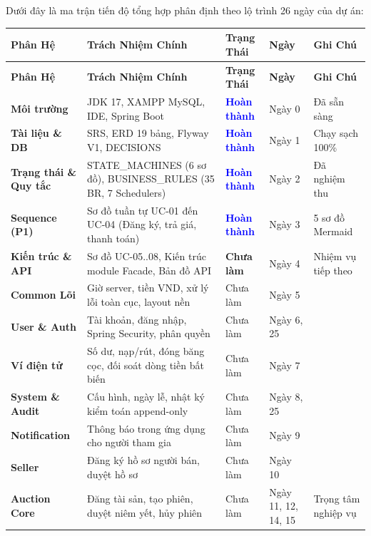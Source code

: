 \documentclass[a4paper]{article}
\begin{document}
Dưới đây là ma trận tiến độ tổng hợp phân định theo lộ trình 26 ngày của dự án:

\begin{longtable}{|p{2.6cm}|p{5.5cm}|p{2.3cm}|p{1.6cm}|p{3.2cm}|}
\hline
\textbf{Phân Hệ} & \textbf{Trách Nhiệm Chính} & \textbf{Trạng Thái} & \textbf{Ngày} & \textbf{Ghi Chú} \\
\hline
\endfirsthead
\hline
\textbf{Phân Hệ} & \textbf{Trách Nhiệm Chính} & \textbf{Trạng Thái} & \textbf{Ngày} & \textbf{Ghi Chú} \\
\hline
\endhead

\textbf{Môi trường} & JDK 17, XAMPP MySQL, IDE, Spring Boot & \textcolor{blue}{\textbf{Hoàn thành}} & Ngày 0 & Đã sẵn sàng \\
\hline
\textbf{Tài liệu \& DB} & SRS, ERD 19 bảng, Flyway V1, DECISIONS & \textcolor{blue}{\textbf{Hoàn thành}} & Ngày 1 & Chạy sạch 100\% \\
\hline
\textbf{Trạng thái \& Quy tắc} & STATE\_MACHINES (6 sơ đồ), BUSINESS\_RULES (35 BR, 7 Schedulers) & \textcolor{blue}{\textbf{Hoàn thành}} & Ngày 2 & Đã nghiệm thu \\
\hline
\textbf{Sequence (P1)} & Sơ đồ tuần tự UC-01 đến UC-04 (Đăng ký, trả giá, thanh toán) & \textcolor{blue}{\textbf{Hoàn thành}} & Ngày 3 & 5 sơ đồ Mermaid \\
\hline
\textbf{Kiến trúc \& API} & Sơ đồ UC-05..08, Kiến trúc module Facade, Bản đồ API & \textbf{Chưa làm} & Ngày 4 & Nhiệm vụ tiếp theo \\
\hline
\textbf{Common Lõi} & Giờ server, tiền VND, xử lý lỗi toàn cục, layout nền & Chưa làm & Ngày 5 & \\
\hline
\textbf{User \& Auth} & Tài khoản, đăng nhập, Spring Security, phân quyền & Chưa làm & Ngày 6, 25 & \\
\hline
\textbf{Ví điện tử} & Số dư, nạp/rút, đóng băng cọc, đối soát dòng tiền bất biến & Chưa làm & Ngày 7 & \\
\hline
\textbf{System \& Audit} & Cấu hình, ngày lễ, nhật ký kiểm toán append-only & Chưa làm & Ngày 8, 25 & \\
\hline
\textbf{Notification} & Thông báo trong ứng dụng cho người tham gia & Chưa làm & Ngày 9 & \\
\hline
\textbf{Seller} & Đăng ký hồ sơ người bán, duyệt hồ sơ & Chưa làm & Ngày 10 & \\
\hline
\textbf{Auction Core} & Đăng tài sản, tạo phiên, duyệt niêm yết, hủy phiên & Chưa làm & Ngày 11, 12, 14, 15 & Trọng tâm nghiệp vụ \\

\end{longtable}
\end{document}
